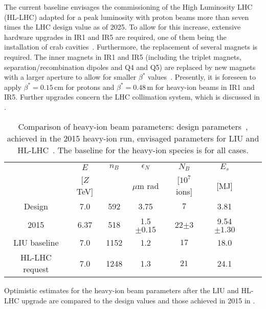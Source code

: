 The current baseline envisages the commissioning of the High Luminosity LHC (HL-LHC) adapted for a peak luminosity with proton beams more than seven times the LHC design value as of 2025. To allow for this increase, extensive hardware upgrades in IR1 and IR5 are required, one of them being the installation of crab cavities~\cite{HLDR}. Furthermore, the replacement of several magnets is required. The inner magnets in IR1 and IR5 (including the triplet magnets, separation/recombination dipoles and Q4 and Q5) are replaced by new magnets with a larger aperture to allow for smaller $\beta^*$ values~\cite{HLDR}. Presently, it is foreseen to apply $\beta^*=0.15\,$cm for protons and $\beta^*=0.48\,$m for heavy-ion beams in IR1 and IR5. Further upgrades concern the LHC collimation system, which is discussed in .


%
	\begin{table}[b]
		\centering
		\caption{Comparison of heavy-ion beam parameters: design parameters~\cite{CERN-2004-003-V1}, achieved in the 2015 heavy-ion run, envisaged parameters for LIU and HL-LHC~\cite{jowett:private}. The baseline for the heavy-ion species is \lead for all cases.}
		\label{tab:LIU_HL_Parameters}
		
		\begin{tabular}{cccccccc}
			\toprule
			                        & $E$             & $n_B$   & $\epsilon_N$  & $N_B$             & $E_s$     \\ %
			                        & {[}$Z$ TeV{]}	  &         &  $\mu$m rad   &  [$10^7$ ions]     & [MJ]             \\ \midrule
			Design                  & 7.0             & 592     & 3.75 & $7$               & 3.81             \\
			2015                    & 6.37            & 518     & 1.5$\pm 0.15$ & 22$\pm3$              & 9.54$\pm1.30$             \\
			LIU baseline            & 7.0             & 1152    & 1.2  & $17$              & 18.0             \\
			HL-LHC request          & 7.0             & 1248    & 1.3 & $21 $             & 24.1             \\ \bottomrule
		\end{tabular}
	\end{table}
%


Optimistic estimates for the heavy-ion beam parameters after the LIU and HL-LHC upgrade are compared to the design values and those achieved in 2015 in . 






